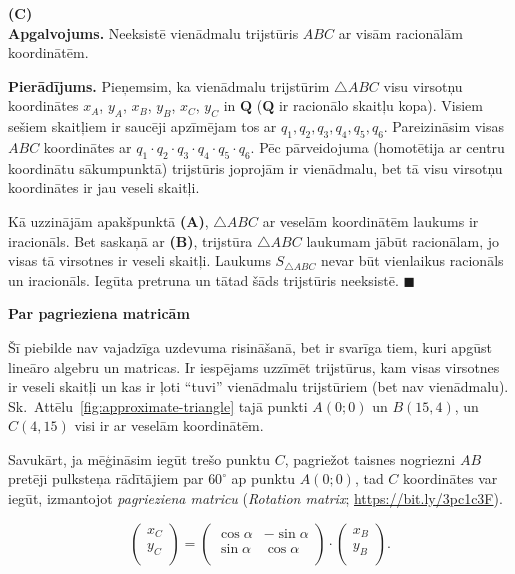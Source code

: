 \documentclass[a4paper,12pt]{article}
\newcommand\Q{\mathbf{Q}}
\begin{document}
\vspace{10pt}
{\bf (C)}\\
{\bf Apgalvojums.} Neeksistē vienādmalu trijstūris $ABC$ ar visām racionālām koordinātēm. 

{\bf Pierādījums.} Pieņemsim, ka vienādmalu trijstūrim
$\bigtriangleup{}ABC$ visu virsotņu koordinātes $x_A$, $y_A$, $x_B$, $y_B$, $x_C$, $y_C$ in $\Q$ 
($\Q$ ir racionālo skaitļu kopa). 
Visiem sešiem skaitļiem ir saucēji \textendash{} apzīmējam tos ar $q_1,q_2,q_3,q_4,q_5,q_6$. 
Pareizināsim visas $ABC$ koordinātes ar $q_1 \cdot q_2\cdot q_3\cdot q_4\cdot q_5\cdot q_6$. 
Pēc pārveidojuma (homotētija ar centru koordinātu sākumpunktā) trijstūris
joprojām ir vienādmalu, bet tā visu virsotņu koordinātes ir jau veseli skaitļi. 

Kā uzzinājām apakšpunktā {\bf (A)}, $\bigtriangleup{}ABC$ ar veselām koordinātēm laukums ir iracionāls. 
Bet saskaņā ar {\bf (B)}, trijstūra $\bigtriangleup{}ABC$ laukumam jābūt racionālam, jo visas tā virsotnes ir veseli skaitļi. 
Laukums $S_{\bigtriangleup{}ABC}$ nevar būt vienlaikus racionāls un iracionāls. Iegūta pretruna un tātad šāds trijstūris neeksistē.
$\blacksquare$


\vspace{20pt}
{\bf Par pagrieziena matricām}

Šī piebilde nav vajadzīga uzdevuma risināšanā, bet ir svarīga tiem, kuri apgūst lineāro algebru un matricas. 
Ir iespējams uzzīmēt trijstūrus, kam visas virsotnes ir veseli skaitļi un 
kas ir ļoti ``tuvi'' vienādmalu trijstūriem (bet nav vienādmalu).
Sk.\ Attēlu~\ref{fig:approximate-triangle} \textendash{} tajā punkti $A(0;0)$ un
$B(15,4)$, un $C(4,15)$ visi ir ar veselām koordinātēm.

Savukārt, ja mēģināsim iegūt trešo punktu $C$, pagriežot taisnes nogriezni $AB$ pretēji pulksteņa rādītājiem par $60^{\circ}$ 
ap punktu $A(0;0)$, 
tad $C$ koordinātes var iegūt, izmantojot {\em pagrieziena matricu} ({\em Rotation matrix}; \url{https://bit.ly/3pc1c3F}). 

\[ \left( \begin{array}{c}
x_C \\
y_C \\
\end{array} \right) = \left(
\begin{array}{ll} 
\cos \alpha & -\sin \alpha \\ 
\sin \alpha  & \cos \alpha \\ 
\end{array} \right) \cdot \left(
\begin{array}{c}
x_B \\
y_B \\
\end{array} \right). \]
\end{document}
